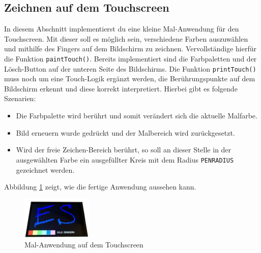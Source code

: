 \subsection{Zeichnen auf dem Touchscreen}
In diesem Abschnitt implementierst du eine kleine Mal-Anwendung für den Touchscreen.
Mit dieser soll es möglich sein, verschiedene Farben auszuwählen und mithilfe des Fingers auf dem Bildschirm zu zeichnen.
Vervollständige hierfür die Funktion \lstinline|paintTouch()|.
Bereits implementiert sind die Farbpaletten und der Lösch-Button auf der unteren Seite des Bildschirms.
Die Funktion \lstinline|printTouch()| muss noch um eine Touch-Logik ergänzt werden, die Berührungspunkte auf dem Bildschirm erkennt und diese korrekt interpretiert.
Hierbei gibt es folgende Szenarien:
\begin{itemize}
\item 
Die Farbpalette wird berührt und somit verändert sich die aktuelle Malfarbe.
\item 
Bild erneuern wurde gedrückt und der Malbereich wird zurückgesetzt.
\item 
Wird der freie Zeichen-Bereich berührt, so soll an dieser Stelle in der ausgewählten Farbe ein ausgefüllter Kreis mit dem Radius \lstinline|PENRADIUS| gezeichnet werden.
\end{itemize}
Abbildung \ref{fig:paintTouch} zeigt, wie die fertige Anwendung aussehen kann.
\begin{figure}[!htb]
	\centering
	\includegraphics[width=0.3\textwidth]{./05_c/figures/Paint-Szenario.png}
	\caption{Mal-Anwendung auf dem Touchscreen}
	\label{fig:paintTouch}
\end{figure} 